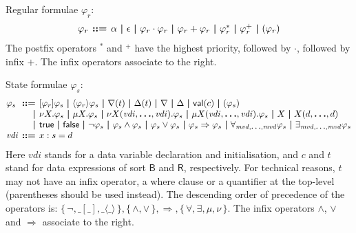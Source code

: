 \documentclass[a4paper,fleqn,10pt]{article}
\makeatletter
\newcommand{\f}[1]{\ensuremath{\mathit{#1}}}
\newcommand{\sbool}{\ensuremath{\mathsf{B}}}
\newcommand{\sreal}{\ensuremath{\mathsf{R}}}
\newenvironment{tightarray}[1]
  {\setlength{\arraycolsep}{2pt}%
   \begin{array}{@{}#1@{}}%
  }
  {\end{array}%
  }
\newcommand{\set}[1]{\ensuremath{\{\,#1\,\}}}
\newcommand{\limp}{\ensuremath{\Rightarrow}}
\newcommand{\mb}[1]{\text{\boldmath$#1$}}
\makeatother
\begin{document}
Regular formulae $\varphi_r$:
\[\begin{tightarray}{lrl}
\varphi_r & \mb{::=} & \alpha\ \mb{|}\
                       \epsilon\ \mb{|}\
                       \varphi_r \cdot \varphi_r\ \mb{|}\
                       \varphi_r + \varphi_r\ \mb{|}\
                       \varphi_r^{*} \ \mb{|}\
                       \varphi_r^{+} \ \mb{|}\
                       ( \varphi_r )
\end{tightarray}\]
The postfix operators ${}^{*}$ and ${}^{+}$ have the highest priority, followed
by $\cdot$, followed by infix $+$. The infix operators associate to the right.

State formulae $\varphi_s$:
\[\begin{tightarray}{lrl}
\varphi_s & \mb{::=} & [\varphi_r]\varphi_s\ \mb{|}\
                       \langle\varphi_r\rangle\varphi_s\ \mb{|}\
                       \nabla(t)\ \mb{|}\
                       \Delta(t)\ \mb{|}\
                       \nabla\ \mb{|}\
                       \Delta\ \mb{|}\
                       \mathsf{val}(c)\ \mb{|}\
                       ( \varphi_s )\\
          & \mb{|}   & \nu X. \varphi_s\ \mb{|}\
                       \mu X.\varphi_s\ \mb{|}\
                       \nu X(\f{vdi},\mb{\ldots},\f{vdi}). \varphi_s\ \mb{|}\
                       \mu X(\f{vdi},\mb{\ldots},\f{vdi}).\varphi_s\ \mb{|}\
                       X\ \mb{|}\
                       X(d,\mb{\ldots},d)\\
          & \mb{|}   & \mathsf{true}\ \mb{|}\
                       \mathsf{false}\ \mb{|}\
                       \neg \varphi_s\ \mb{|}\
                       \varphi_s \land \varphi_s\ \mb{|}\
                       \varphi_s \lor  \varphi_s\ \mb{|}\
                       \varphi_s \limp \varphi_s\ \mb{|}\
                       \forall_{\f{mvd},\mb{\ldots},\f{mvd}} \varphi_s\ \mb{|}\
                       \exists_{\f{mvd},\mb{\ldots},\f{mvd}} \varphi_s\\
\f{vdi}  & \mb{::=} & x: s = d\\
\end{tightarray}\]
Here $\f{vdi}$ stands for a data variable declaration and initialisation,
and $c$ and $t$ stand for data expressions of sort $\sbool$ and
$\sreal$, respectively.
For technical reasons, $t$ may not have an infix operator, a where
clause or a quantifier at the top-level (parentheses should be used
instead).
The descending order of precedence of the operators is: $\set{\neg,
\_[\_], \_\langle\_\rangle}, \set{\land,\lor}, \limp, \set{\forall,
\exists, \mu, \nu}$.  The infix operators $\land$, $\lor$ and $\limp$
associate to the right.
\end{document}
